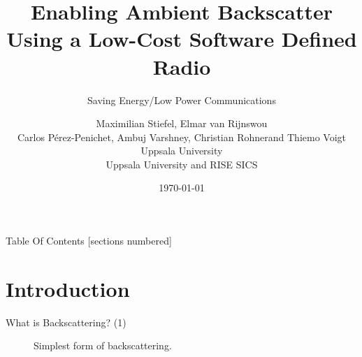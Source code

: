 \documentclass[apectratio=169]{beamer}
\title{Enabling Ambient Backscatter\\
Using a Low-Cost Software Defined Radio}
\subtitle{Saving Energy/Low Power Communications}
\date{\vspace{1em}
\today}
\author{Maximilian Stiefel\myast, Elmar van Rijnswou\myast\\Carlos Pérez-Penichet\myast, Ambuj Varshney\myast, Christian Rohner\myast and Thiemo Voigt \mydagger
\\\myast Uppsala University
\\\mydagger Uppsala University and RISE SICS
}
\institute{13th Swedish National Computer Networking Workshop}
\begin{document}
  \maketitle

\begin{frame}{Table Of Contents}
  [sections numbered]
  \tableofcontents[hideallsubsections]
\end{frame}

\section{Introduction}
\begin{frame}{What is Backscattering? (1)}
	\begin{figure}[H]	
		\centering
		\caption{Simplest form of backscattering.}
	\end{figure}
\end{frame}
\end{document}
